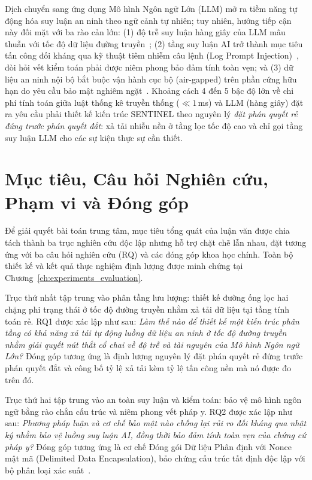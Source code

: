 Dịch chuyển sang ứng dụng Mô hình Ngôn ngữ Lớn (LLM) mở ra tiềm năng tự động hóa suy luận an ninh theo ngữ cảnh tự nhiên; tuy nhiên, hướng tiếp cận này đối mặt với ba rào cản lớn: (1) độ trễ suy luận hàng giây của LLM mâu thuẫn với tốc độ dữ liệu đường truyền~\cite{vaswani2017}; (2) tầng suy luận AI trở thành mục tiêu tấn công đối kháng qua kỹ thuật tiêm nhiễm câu lệnh (Log Prompt Injection)~\cite{promptinjection2023}, đòi hỏi vết kiểm toán phải được niêm phong bảo đảm tính toàn vẹn; và (3) dữ liệu an ninh nội bộ bắt buộc vận hành cục bộ (air-gapped) trên phần cứng hữu hạn do yêu cầu bảo mật nghiêm ngặt~\cite{nist80207}. Khoảng cách 4 đến 5 bậc độ lớn về chi phí tính toán giữa luật thống kê truyền thống ($\ll 1$\,ms) và LLM (hàng giây) đặt ra yêu cầu phải thiết kế kiến trúc SENTINEL theo nguyên lý \textit{đặt phán quyết rẻ đứng trước phán quyết đắt}: xả tải nhiễu nền ở tầng lọc tốc độ cao và chỉ gọi tầng suy luận LLM cho các sự kiện thực sự cần thiết.

\section{Mục tiêu, Câu hỏi Nghiên cứu, Phạm vi và Đóng góp}
\label{sec:rq}

Để giải quyết bài toán trung tâm, mục tiêu tổng quát của luận văn được chia tách thành ba trục nghiên cứu độc lập nhưng hỗ trợ chặt chẽ lẫn nhau, đặt tương ứng với ba câu hỏi nghiên cứu (RQ) và các đóng góp khoa học chính. Toàn bộ thiết kế và kết quả thực nghiệm định lượng được minh chứng tại Chương~\ref{ch:experiments_evaluation}.

Trục thứ nhất tập trung vào phân tầng lưu lượng: thiết kế đường ống lọc hai chặng phi trạng thái ở tốc độ đường truyền nhằm xả tải dữ liệu tại tầng tính toán rẻ. RQ1 được xác lập như sau: \textit{Làm thế nào để thiết kế một kiến trúc phân tầng có khả năng xả tải tự động luồng dữ liệu an ninh ở tốc độ đường truyền nhằm giải quyết nút thắt cổ chai về độ trễ và tài nguyên của Mô hình Ngôn ngữ Lớn?} Đóng góp tương ứng là định lượng nguyên lý đặt phán quyết rẻ đứng trước phán quyết đắt và công bố tỷ lệ xả tải kèm tỷ lệ tấn công nền mà nó được đo trên đó.

Trục thứ hai tập trung vào an toàn suy luận và kiểm toán: bảo vệ mô hình ngôn ngữ bằng rào chắn cấu trúc và niêm phong vết pháp y. RQ2 được xác lập như sau: \textit{Phương pháp luận và cơ chế bảo mật nào chống lại rủi ro đối kháng qua nhật ký nhằm bảo vệ luồng suy luận AI, đồng thời bảo đảm tính toàn vẹn của chứng cứ pháp y?} Đóng góp tương ứng là cơ chế Đóng gói Dữ liệu Phân định với Nonce mật mã (Delimited Data Encapsulation), bảo chứng cấu trúc tất định độc lập với bộ phân loại xác suất~\cite{owasp_llm2025}.

